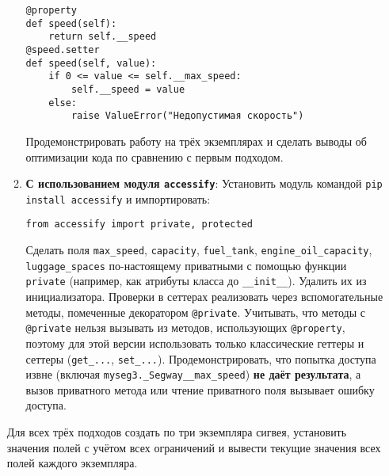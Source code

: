 \begin{enumerate}
\begin{enumerate}
\begin{verbatim}
@property
def speed(self):
    return self.__speed
@speed.setter
def speed(self, value):
    if 0 <= value <= self.__max_speed:
        self.__speed = value
    else:
        raise ValueError("Недопустимая скорость")
    \end{verbatim}  
    Продемонстрировать работу на трёх экземплярах и сделать выводы об оптимизации кода по сравнению с первым подходом.
    \item \textbf{С использованием модуля \texttt{accessify}}:  
    Установить модуль командой \texttt{pip install accessify} и импортировать:  
    \begin{verbatim}
from accessify import private, protected
    \end{verbatim}  
    Сделать поля \texttt{max\_speed}, \texttt{capacity}, \texttt{fuel\_tank}, \texttt{engine\_oil\_capacity}, \texttt{luggage\_spaces} по-настоящему приватными с помощью функции \texttt{private} (например, как атрибуты класса до \texttt{\_\_init\_\_}). Удалить их из инициализатора.  
    Проверки в сеттерах реализовать через вспомогательные методы, помеченные декоратором \texttt{@private}.  
    Учитывать, что методы с \texttt{@private} нельзя вызывать из методов, использующих \texttt{@property}, поэтому для этой версии использовать только классические геттеры и сеттеры (\texttt{get\_...}, \texttt{set\_...}).  
    Продемонстрировать, что попытка доступа извне (включая \texttt{myseg3.\_Segway\_\_max\_speed}) \textbf{не даёт результата}, а вызов приватного метода или чтение приватного поля вызывает ошибку доступа.
\end{enumerate}
Для всех трёх подходов создать по три экземпляра сигвея, установить значения полей с учётом всех ограничений и вывести текущие значения всех полей каждого экземпляра.
\end{enumerate}